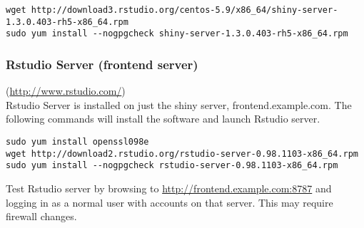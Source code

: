 \begin{verbatim}
wget http://download3.rstudio.org/centos-5.9/x86_64/shiny-server-1.3.0.403-rh5-x86_64.rpm
sudo yum install --nogpgcheck shiny-server-1.3.0.403-rh5-x86_64.rpm
\end{verbatim}

\subsubsection{Rstudio Server (frontend server)}(\url{http://www.rstudio.com/})\\
Rstudio Server is installed on just the shiny server,
frontend.example.com.  The following commands will install the software
and launch Rstudio server.
\begin{verbatim}
sudo yum install openssl098e
wget http://download2.rstudio.org/rstudio-server-0.98.1103-x86_64.rpm
sudo yum install --nogpgcheck rstudio-server-0.98.1103-x86_64.rpm
\end{verbatim}

Test Rstudio server by browsing to \url{http://frontend.example.com:8787}
and logging in as a normal user with accounts on that server.  This may
require firewall changes.
